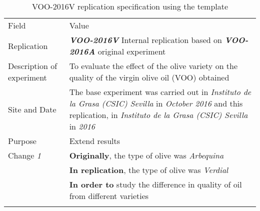 \begin{table*}[h]
  \caption{VOO-2016V replication specification using the template}
\label{tab:edi}
  \centering

\begin{tabularx}{\textwidth}{
  >{\hsize=0.25\hsize}X
  >{\hsize=0.8\hsize}X}
  
    \noalign{\smallskip}\hline\noalign{\smallskip}
  
  Field &  Value  \\ 
  \noalign{\smallskip}\hline\noalign{\smallskip}
 
 Replication &   \textbf{\emph{VOO-2016V}}   Internal replication based on \textbf{\emph{VOO-2016A}}  original experiment   \\
     
 Description \newline of experiment &  To evaluate the effect of the olive variety on the quality of the virgin olive oil (VOO) obtained \\  
 
 Site and Date & The base experiment was carried out in  \textit{Instituto de la Grasa (CSIC) Sevilla}  in  \textit{October 2016} and this replication, in  \textit{Instituto de la Grasa (CSIC) Sevilla} in \textit{2016}    \\
    Purpose  &  Extend results \\  
\hline   
    Change \textit{1}   & \textbf{Originally}, the type of olive was \textit{Arbequina} \\& \textbf{In replication}, the type of olive was \textit{Verdial} \\& \textbf{In order to} study the difference in quality of oil from different varieties   \\
    
	
   	\noalign{\smallskip\smallskip}\hline
	\end{tabularx}  
\end{table*}
